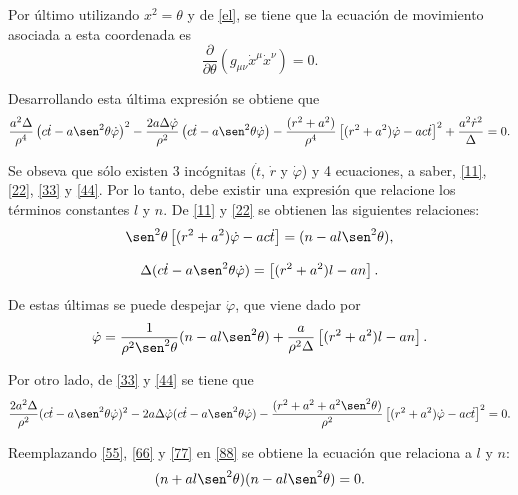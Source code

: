 Por \'ultimo utilizando $x^2=\theta$ y de \eqref{el}, se tiene que la ecuaci\'on de movimiento asociada a esta coordenada es
\begin{equation}
\frac{\partial }{\partial \theta}\left(g_{\mu \nu}\dot{x}^{\mu}\dot{x}^{\nu} \right)=0.
\end{equation} 

Desarrollando esta \'ultima expresi\'on se obtiene que
\begin{equation}\label{44}
\frac{a^2\Delta}{\rho^4}\left(c\dot{t}-a\sen^2 \theta \dot{\varphi} \right)^2-\frac{2a\Delta \dot{\varphi}}{\rho^2}\left(c\dot{t}-a\sen^2 \theta \dot{\varphi} \right)-\frac{(r^2+a^2)}{\rho^4}\left[(r^2+a^2)\dot{\varphi}-ac\dot{t} \right]^2+\frac{a^2\dot{r}^2}{\Delta}=0.
\end{equation}
 
Se obseva que s\'olo existen 3 inc\'ognitas ($\dot{t}$, $\dot{r}$ y $\dot{\varphi}$) y 4 ecuaciones, a saber, \eqref{11}, \eqref{22}, \eqref{33} y \eqref{44}. Por lo tanto, debe existir una expresi\'on que relacione los t\'erminos constantes $l$ y $n$. De \eqref{11} y \eqref{22} se obtienen las siguientes relaciones:
\begin{equation}\label{55}
\sen^2\theta \left[(r^2+a^2)\dot{\varphi}-ac\dot{t} \right]=(n-al\sen^2\theta),
\end{equation}
 
\begin{equation}\label{66}
\Delta(c\dot{t}-a\sen^2\theta\dot{\varphi})=\left[(r^2+a^2)l-an\right].
\end{equation}
 
De estas \'ultimas se puede despejar $\dot{\varphi}$, que viene dado por
\begin{equation}\label{77}
\dot{\varphi}=\frac{1}{\rho^2\sen^2\theta}(n-al\sen^2\theta)+\frac{a}{\rho^2\Delta}\left[(r^2+a^2)l-an\right].
\end{equation}
 
 Por otro lado, de \eqref{33} y \eqref{44} se tiene que
\begin{equation}\label{88}
 \frac{2a^2\Delta}{\rho^2}(c\dot{t}-a\sen^2\theta\dot{\varphi})^2 
 -2a\Delta \dot{\varphi}(c\dot{t}-a\sen^2\theta\dot{\varphi})-\frac{(r^2+a^2+a^2\sen^2\theta)}{\rho^2}\left[(r^2+a^2)\dot{\varphi}-ac\dot{t}\right]^2=0.
\end{equation}
 
 Reemplazando \eqref{55}, \eqref{66} y \eqref{77} en \eqref{88} se obtiene la ecuaci\'on que relaciona a $l$ y $n$:
 \begin{equation}
 (n+al\sen^2 \theta)(n-al\sen^2 \theta)=0.
 \end{equation}
 
